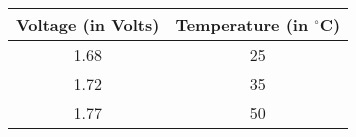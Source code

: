 
\begin{center}
\begin{tabular}{|c|c|}
\hline
\textbf{Voltage (in Volts)} & \textbf{Temperature (in $^{\circ}$C)} \\ \hline
1.68 & 25 \\ \hline
1.72 & 35\\ \hline
1.77 & 50 \\ \hline
\end{tabular}
\end{center}
